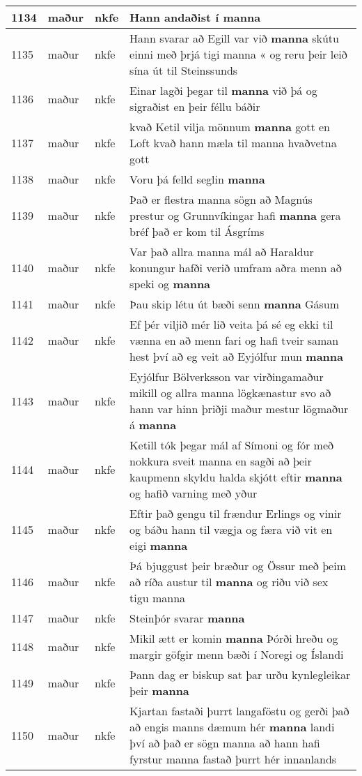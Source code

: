 \documentclass{article}
\begin{document}
\begin{longtable}{p{1cm}|p{1cm}|p{1cm}|p{13cm}}
\hline
1134&maður&nkfe&Hann andaðist í \textbf{manna} \\
\hline
1135&maður&nkfe&Hann svarar að Egill var við \textbf{manna} skútu einni með þrjá tigi manna « og reru þeir leið sína út til Steinssunds\\
\hline
1136&maður&nkfe&Einar lagði þegar til \textbf{manna} við þá og sigraðist en þeir féllu báðir\\
\hline
1137&maður&nkfe&kvað Ketil vilja mönnum \textbf{manna} gott en Loft kvað hann mæla til manna hvaðvetna gott\\
\hline
1138&maður&nkfe&Voru þá felld seglin \textbf{manna} \\
\hline
1139&maður&nkfe&Það er flestra manna sögn að Magnús prestur og Grunnvíkingar hafi \textbf{manna} gera bréf það er kom til Ásgríms\\
\hline
1140&maður&nkfe&Var það allra manna mál að Haraldur konungur hafði verið umfram aðra menn að speki og \textbf{manna} \\
\hline
1141&maður&nkfe&Þau skip létu út bæði senn \textbf{manna} Gásum\\
\hline
1142&maður&nkfe&Ef þér viljið mér lið veita þá sé eg ekki til vænna en að menn fari og hafi tveir saman hest því að eg veit að Eyjólfur mun \textbf{manna} \\
\hline
1143&maður&nkfe&Eyjólfur Bölverksson var virðingamaður mikill og allra manna lögkænastur svo að hann var hinn þriðji maður mestur lögmaður á \textbf{manna} \\
\hline
1144&maður&nkfe&Ketill tók þegar mál af Símoni og fór með nokkura sveit manna en sagði að þeir kaupmenn skyldu halda skjótt eftir \textbf{manna} og hafið varning með yður\\
\hline
1145&maður&nkfe&Eftir það gengu til frændur Erlings og vinir og báðu hann til vægja og færa við vit en eigi \textbf{manna} \\
\hline
1146&maður&nkfe&Þá bjuggust þeir bræður og Össur með þeim að ríða austur til \textbf{manna} og riðu við sex tigu manna\\
\hline
1147&maður&nkfe&Steinþór svarar \textbf{manna} \\
\hline
1148&maður&nkfe&Mikil ætt er komin \textbf{manna} Þórði hreðu og margir göfgir menn bæði í Noregi og Íslandi\\
\hline
1149&maður&nkfe&Þann dag er biskup sat þar urðu kynlegleikar þeir \textbf{manna} \\
\hline
1150&maður&nkfe&Kjartan fastaði þurrt langaföstu og gerði það að engis manns dæmum hér \textbf{manna} landi því að það er sögn manna að hann hafi fyrstur manna fastað þurrt hér innanlands\\

\end{longtable}
\end{document}
